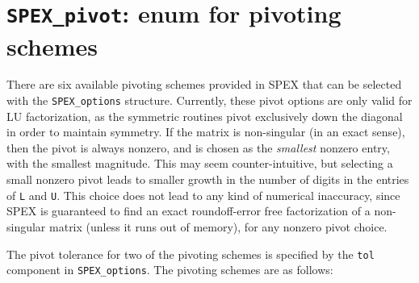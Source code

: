 \documentclass[12pt,oneside]{book}
\theoremstyle{definition}
\begin{document}
\section{\texttt{SPEX\_pivot}: enum for pivoting schemes}\label{ss:SPEX_pivot}
There are six available pivoting schemes provided in SPEX that can be
selected with the \verb|SPEX_options| structure. Currently, these pivot options
are only valid for LU factorization, as the symmetric routines pivot exclusively
down the diagonal in order to maintain symmetry. If the matrix is non-singular
(in an exact sense), then the pivot is always nonzero, and is chosen as the
{\em smallest} nonzero entry, with the smallest magnitude.  This may seem
counter-intuitive, but selecting a small nonzero pivot leads to smaller growth
in the number of digits in the entries of \verb|L| and \verb|U|.  This choice
does not lead to any kind of numerical inaccuracy, since SPEX is guaranteed
to find an exact roundoff-error free factorization of a non-singular matrix
(unless it runs out of memory), for any nonzero pivot choice.

The pivot tolerance for two of the pivoting schemes is specified by the
\verb|tol| component in \verb|SPEX_options|.  The pivoting schemes are as
follows:
\end{document}
